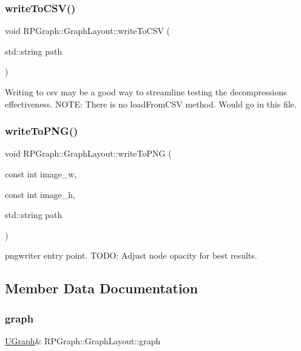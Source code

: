 \subsubsection{\texorpdfstring{write\+To\+C\+S\+V()}{writeToCSV()}}
{\footnotesize\ttfamily void R\+P\+Graph\+::\+Graph\+Layout\+::write\+To\+C\+SV (\begin{DoxyParamCaption}\item[{std\+::string}]{path }\end{DoxyParamCaption})}

Writing to csv may be a good way to streamline testing the decompressions effectiveness. N\+O\+TE\+: There is no load\+From\+C\+SV method. Would go in this file. \mbox{\label{classRPGraph_1_1GraphLayout_ab5892ee9d2eba41d1f285f0e480d00e2}} 
\subsubsection{\texorpdfstring{write\+To\+P\+N\+G()}{writeToPNG()}}
{\footnotesize\ttfamily void R\+P\+Graph\+::\+Graph\+Layout\+::write\+To\+P\+NG (\begin{DoxyParamCaption}\item[{const int}]{image\+\_\+w,  }\item[{const int}]{image\+\_\+h,  }\item[{std\+::string}]{path }\end{DoxyParamCaption})}

pngwriter entry point. T\+O\+DO\+: Adjust node opacity for best results.

\subsection{Member Data Documentation}
\mbox{\label{classRPGraph_1_1GraphLayout_af44bb2c10eee4ef67c95355ce93432a5}} 
\subsubsection{\texorpdfstring{graph}{graph}}
{\footnotesize\ttfamily \mbox{\hyperlink{classRPGraph_1_1UGraph}{U\+Graph}}\& R\+P\+Graph\+::\+Graph\+Layout\+::graph}

